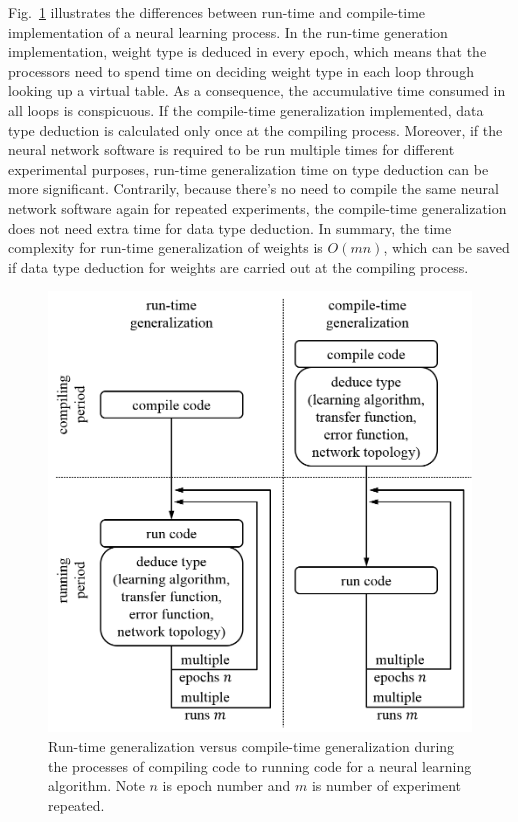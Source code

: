 \documentclass[procedia]{easychair}
\begin{document}
Fig.~\ref{fig:run_vs_compile} illustrates the differences between run-time and compile-time implementation of a neural learning process.  In the run-time generation implementation, weight type is deduced in every epoch, which means that the processors need to spend time on deciding weight type in each loop through looking up a virtual table.  As a consequence, the accumulative time consumed in all loops is conspicuous.  If the compile-time generalization implemented, data type deduction is calculated only once at the compiling process.  Moreover, if the neural network software is required to be run multiple times for different experimental purposes, run-time generalization time on type deduction can be more significant.  Contrarily, because there’s no need to compile the same neural network software again for repeated experiments, the compile-time generalization does not need extra time for data type deduction.  In summary, the time complexity for run-time generalization of weights is $O(mn)$, which can be saved if data type deduction for weights are carried out at the compiling process.

\begin{figure}[tb]
    \begin{centering}
        \includegraphics[scale=0.5]{../pic/run_vs_compile.png}
        \caption{Run-time generalization versus compile-time generalization during the processes of compiling code to running code for a neural learning algorithm.  Note $n$ is epoch number and $m$ is number of experiment repeated.}
        \label{fig:run_vs_compile}
	\end{centering}
\end{figure}
\end{document}

